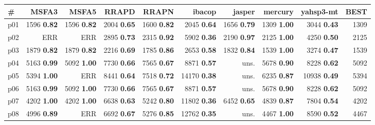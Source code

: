 \begin{tabular}{|l|rrrrrrrr|r|}
\hline
\textbf{\#} & \textbf{MSFA3} & \textbf{MSFA5} & \textbf{RRAPD} & \textbf{RRAPN} & \textbf{ibacop} & \textbf{jasper} & \textbf{mercury} & \textbf{yahsp3-mt} & \textbf{BEST}\\
\hline
p01 & {\footnotesize 1596} \textbf{0.82} & {\footnotesize 1596} \textbf{0.82} & {\footnotesize 2004} \textbf{0.65} & {\footnotesize 1600} \textbf{0.82} & {\footnotesize 2045} \textbf{0.64} & {\footnotesize 1656} \textbf{0.79} & {\footnotesize 1309} \textbf{1.00} & {\footnotesize 3044} \textbf{0.43} & 1309\\
p02 & ERR & ERR & {\footnotesize 2895} \textbf{0.73} & {\footnotesize 2315} \textbf{0.92} & {\footnotesize 5902} \textbf{0.36} & {\footnotesize 2190} \textbf{0.97} & {\footnotesize 2125} \textbf{1.00} & {\footnotesize 4250} \textbf{0.50} & 2125\\
p03 & {\footnotesize 1879} \textbf{0.82} & {\footnotesize 1879} \textbf{0.82} & {\footnotesize 2216} \textbf{0.69} & {\footnotesize 1785} \textbf{0.86} & {\footnotesize 2653} \textbf{0.58} & {\footnotesize 1832} \textbf{0.84} & {\footnotesize 1539} \textbf{1.00} & {\footnotesize 3274} \textbf{0.47} & 1539\\
p04 & {\footnotesize 5163} \textbf{0.99} & {\footnotesize 5092} \textbf{1.00} & {\footnotesize 7730} \textbf{0.66} & {\footnotesize 7565} \textbf{0.67} & {\footnotesize 8871} \textbf{0.57} & uns. & {\footnotesize 5678} \textbf{0.90} & {\footnotesize 8228} \textbf{0.62} & 5092\\
p05 & {\footnotesize 5394} \textbf{1.00} & ERR & {\footnotesize 8441} \textbf{0.64} & {\footnotesize 7518} \textbf{0.72} & {\footnotesize 14170} \textbf{0.38} & uns. & {\footnotesize 6235} \textbf{0.87} & {\footnotesize 10938} \textbf{0.49} & 5394\\
p06 & {\footnotesize 5163} \textbf{0.99} & {\footnotesize 5092} \textbf{1.00} & {\footnotesize 7730} \textbf{0.66} & {\footnotesize 7565} \textbf{0.67} & {\footnotesize 8871} \textbf{0.57} & uns. & {\footnotesize 5678} \textbf{0.90} & {\footnotesize 8228} \textbf{0.62} & 5092\\
p07 & {\footnotesize 4202} \textbf{1.00} & {\footnotesize 4202} \textbf{1.00} & {\footnotesize 6638} \textbf{0.63} & {\footnotesize 5242} \textbf{0.80} & {\footnotesize 11802} \textbf{0.36} & {\footnotesize 6452} \textbf{0.65} & {\footnotesize 4839} \textbf{0.87} & {\footnotesize 7804} \textbf{0.54} & 4202\\
p08 & {\footnotesize 4996} \textbf{0.89} & ERR & {\footnotesize 6692} \textbf{0.67} & {\footnotesize 5276} \textbf{0.85} & {\footnotesize 12762} \textbf{0.35} & uns. & {\footnotesize 4467} \textbf{1.00} & {\footnotesize 8590} \textbf{0.52} & 4467\\

\end{tabular}
